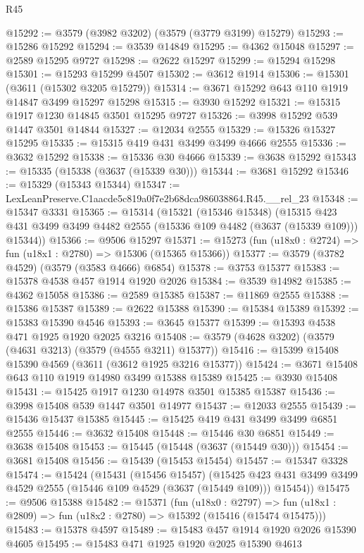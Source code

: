 \begin{lexlean}{R45}
\begin{coremodule}
@15292 := @3579 (@3982 @3202) (@3579 (@3779 @3199) @15279)
@15293 := @15286 @15292
@15294 := @3539 @14849
@15295 := @4362 @15048
@15297 := @2589 @15295 @9727
@15298 := @2622 @15297
@15299 := @15294 @15298
@15301 := @15293 @15299 @4507
@15302 := @3612 @1914
@15306 := @15301 (@3611 (@15302 @3205 @15279))
@15314 := @3671 @15292 @643 @110 @1919 @14847 @3499 @15297 @15298
@15315 := @3930 @15292
@15321 := @15315 @1917 @1230 @14845 @3501 @15295 @9727
@15326 := @3998 @15292 @539 @1447 @3501 @14844
@15327 := @12034 @2555
@15329 := @15326 @15327 @15295
@15335 := @15315 @419 @431 @3499 @3499 @4666 @2555
@15336 := @3632 @15292
@15338 := @15336 @30 @4666
@15339 := @3638 @15292
@15343 := @15335 (@15338 (@3637 (@15339 @30)))
@15344 := @3681 @15292
@15346 := @15329 (@15343 @15344)
@15347 := LexLeanPreserve.C1aacde5c819a0f7e2b68dca986038864.R45.__rel_23
@15348 := @15347 @3331
@15365 := @15314
    (@15321
      (@15346 @15348)
      (@15315 @423 @431 @3499 @3499 @4482 @2555 (@15336 @109 @4482 (@3637 (@15339 @109))) @15344))
@15366 := @9506 @15297
@15371 := @15273 (fun (u18x0 : @2724) => fun (u18x1 : @2780) => @15306 (@15365 @15366))
@15377 := @3579 (@3782 @4529) (@3579 (@3583 @4666) @6854)
@15378 := @3753 @15377
@15383 := @15378 @4538 @457 @1914 @1920 @2026
@15384 := @3539 @14982
@15385 := @4362 @15058
@15386 := @2589 @15385
@15387 := @11869 @2555
@15388 := @15386 @15387
@15389 := @2622 @15388
@15390 := @15384 @15389
@15392 := @15383 @15390 @4546
@15393 := @3645 @15377
@15399 := @15393 @4538 @471 @1925 @1920 @2025 @3216
@15408 := @3579 (@4628 @3202) (@3579 (@4631 @3213) (@3579 (@4555 @3211) @15377))
@15416 := @15399 @15408 @15390 @4569 (@3611 (@3612 @1925 @3216 @15377))
@15424 := @3671 @15408 @643 @110 @1919 @14980 @3499 @15388 @15389
@15425 := @3930 @15408
@15431 := @15425 @1917 @1230 @14978 @3501 @15385 @15387
@15436 := @3998 @15408 @539 @1447 @3501 @14977
@15437 := @12033 @2555
@15439 := @15436 @15437 @15385
@15445 := @15425 @419 @431 @3499 @3499 @6851 @2555
@15446 := @3632 @15408
@15448 := @15446 @30 @6851
@15449 := @3638 @15408
@15453 := @15445 (@15448 (@3637 (@15449 @30)))
@15454 := @3681 @15408
@15456 := @15439 (@15453 @15454)
@15457 := @15347 @3328
@15474 := @15424
    (@15431
      (@15456 @15457)
      (@15425 @423 @431 @3499 @3499 @4529 @2555 (@15446 @109 @4529 (@3637 (@15449 @109))) @15454))
@15475 := @9506 @15388
@15482 := @15371
    (fun (u18x0 : @2797) =>
    fun (u18x1 : @2809) => fun (u18x2 : @2780) => @15392 (@15416 (@15474 @15475)))
@15483 := @15378 @4597
@15489 := @15483 @457 @1914 @1920 @2026 @15390 @4605
@15495 := @15483 @471 @1925 @1920 @2025 @15390 @4613

\end{coremodule}
\end{lexlean}
